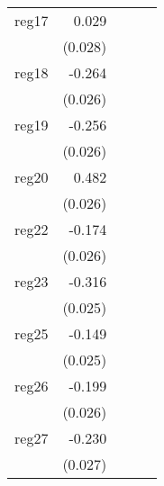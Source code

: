 {\begin{longtable}{l*{4}{D{.}{.}{-1}}}
\addlinespace
reg17       &       0.029         &                     &                     &                     \\
            &     (0.028)         &                     &                     &                     \\
\addlinespace
reg18       &      -0.264\sym{***}&                     &                     &                     \\
            &     (0.026)         &                     &                     &                     \\
\addlinespace
reg19       &      -0.256\sym{***}&                     &                     &                     \\
            &     (0.026)         &                     &                     &                     \\
\addlinespace
reg20       &       0.482\sym{***}&                     &                     &                     \\
            &     (0.026)         &                     &                     &                     \\
\addlinespace
reg22       &      -0.174\sym{***}&                     &                     &                     \\
            &     (0.026)         &                     &                     &                     \\
\addlinespace
reg23       &      -0.316\sym{***}&                     &                     &                     \\
            &     (0.025)         &                     &                     &                     \\
\addlinespace
reg25       &      -0.149\sym{***}&                     &                     &                     \\
            &     (0.025)         &                     &                     &                     \\
\addlinespace
reg26       &      -0.199\sym{***}&                     &                     &                     \\
            &     (0.026)         &                     &                     &                     \\
\addlinespace
reg27       &      -0.230\sym{***}&                     &                     &                     \\
            &     (0.027)         &                     &                     &                     \\

\end{longtable}}

